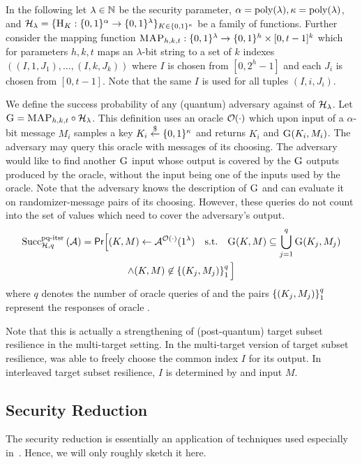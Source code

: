 In the following
let $\lambda\in\NN$ be the security parameter, $\alpha=\poly(\lambda),\kappa =\poly(\lambda)$, and
$\hf_\lambda = \{\h_K: \bin^{\alpha} \rightarrow \bin^{\lambda}\}_{K \in \bin^\kappa}$ be a
family of functions. 
Further consider the mapping function $\fmap_{h,k,t}: \bin^{\lambda} \rightarrow \bin^h \times [0,t-1]^k$
which for parameters $h,k,t$ maps an $\lambda$-bit string
to a set of $k$ indexes $((I,1,J_1),\ldots,(I,k,J_k))$
where $I$ is chosen from $[0,2^h-1]$ and each $J_i$ is chosen from $[0,t-1]$. 
Note that the same $I$ is used for all tuples $(I, i,J_i)$. 

We define the success probability of any (quantum) adversary \A against \pqmmspr
of $\hf_\lambda$. Let $\g =  \fmap_{h,k,t} \circ \hf_\lambda$.
This definition uses an oracle $\oracle(\cdot)$ which upon input of a 
$\alpha$-bit message $M_i$ samples a key $K_i \rand\bin^\kappa$
and returns $K_i$ and $\g(K_i,M_i)$. The 
adversary may query this oracle with messages of its choosing.
The adversary would like to find another $\g$ input
whose output is covered by the $\g$ outputs produced by the oracle,
without the input being one of the inputs used by the oracle.
Note that the adversary knows the 
description of $\g$ and can evaluate it on randomizer-message pairs of its 
choosing. However, these queries do not count into the set of values which need 
to cover the adversary's output.
\begin{multline*}
  \succf{\text{pq-itsr}}{\hf, q}{\adver} = \pr\Big[(K,M)\exec\A^{\oracle(\cdot)}(1^\lambda) 
  \quad\text{s.t.}\quad
  \g(K,M)\subseteq\bigcup_{j=1}^{q} \g(K_j,M_{j}) \\
  \wedge (K,M) \not\in \vecify{1}{q}{(K_j,M_{j})}\Big]
\end{multline*}
where $q$ denotes the number of oracle queries of \A and the pairs 
$\vecify{1}{q}{(K_j,M_{j})}$ represent the responses of oracle \oracle. 

Note that this is actually a strengthening of (post-quantum) target subset resilience 
in the multi-target setting. In the multi-target version of target subset 
resilience, \A was able to freely choose the common index $I$ for its output. 
In interleaved target subset resilience, $I$ is determined by \g and input $M$. 

\subsection{Security Reduction}
The security reduction is essentially an application of techniques used 
especially in~\cite{Huelsing2016}. Hence, we will only roughly sketch it here.

